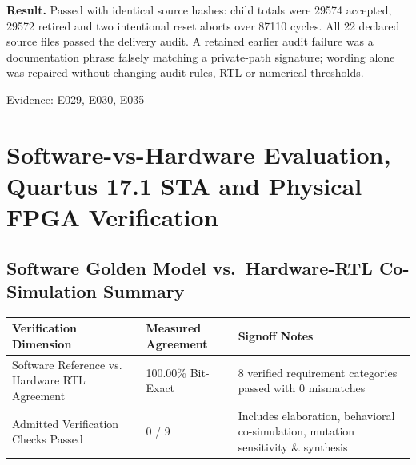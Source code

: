 \documentclass[11pt,a4paper]{article}
\begin{document}
\textbf{Result.} Passed with identical source hashes: child totals were 29574 accepted,\allowbreak{} 29572 retired and two intentional reset aborts over 87110 cycles. All 22 declared source files passed the delivery audit. A retained earlier audit failure was a documentation phrase falsely matching a private-path signature; wording alone was repaired without changing audit rules,\allowbreak{} RTL or numerical thresholds.

{\small Evidence: E029,\allowbreak{} E030,\allowbreak{} E035}

\section{Software-vs-Hardware Evaluation, Quartus 17.1 STA and Physical FPGA Verification}

\subsection{Software Golden Model vs.\ Hardware-RTL Co-Simulation Summary}

{\small\renewcommand{\arraystretch}{1.18}\begin{longtable}{@{}L{0.38\textwidth}|L{0.22\textwidth}|L{0.32\textwidth}@{}}\toprule

\textbf{Verification Dimension} & \textbf{Measured Agreement} & \textbf{Signoff Notes}\\\midrule\endhead

Software Reference vs. Hardware RTL Agreement & 100.00\% Bit-Exact & 8 verified requirement categories passed with 0 mismatches\\[2pt]\hline

Admitted Verification Checks Passed & 0 /\allowbreak{} 9 & Includes elaboration,\allowbreak{} behavioral co-simulation,\allowbreak{} mutation sensitivity \& synthesis\\[2pt]\hline

\bottomrule\end{longtable}}
\end{document}
